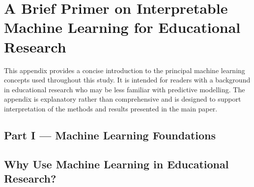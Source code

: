 %
%
%
%

\appendix

\section{A Brief Primer on Interpretable Machine Learning for Educational Research}

This appendix provides a concise introduction to the principal machine learning concepts used throughout this study. It is intended for readers with a background in 
educational research who may be less familiar with predictive modelling. The appendix is explanatory rather than comprehensive and is designed to support interpretation 
of the methods and results presented in the main paper.


\subsection*{Part I — Machine Learning Foundations}
\subsection{Why Use Machine Learning in Educational Research?}

